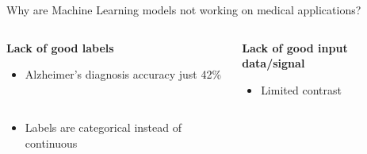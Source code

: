 \documentclass[8pt,xcolor=table,aspectratio=169]{beamer}
\begin{document}
\begin{frame}{Why are Machine Learning models not working on medical applications?}

\vspace{-1em}


\begin{columns}[t]
\begin{column}{0.5\textwidth}
\centering

 \textbf{\large Lack of good labels}

\begin{itemize}

 \item Alzheimer's diagnosis accuracy just 42\%

 \begin{center}
\\ 
\end{center}

\vspace{2.5em}

 \item Labels are categorical instead of continuous\\
\vo
{} 

\end{itemize}

 \vspace{1em}
 

\end{column}
\begin{column}{0.5\textwidth}
\centering

 \textbf{\large Lack of good input data/signal}
\begin{itemize}
 \item Limited contrast

 \begin{center}
\end{center}


\vspace{1em}


\end{itemize}
\end{column}
\end{columns}
\end{frame}
\end{document}
